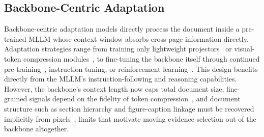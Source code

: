 \documentclass[11pt]{article}
\begin{document}
\subsection{Backbone-Centric Adaptation}
\label{sec:arch-bc}
Backbone-centric adaptation models directly process the document inside a pre-trained MLLM whose context window absorbs cross-page information directly. Adaptation strategies range from training only lightweight projectors~\cite{tanaka2024instructdoc} or visual-token compression modules~\cite{hu2025mplug2}, to fine-tuning the backbone itself through continued pre-training~\cite{duan2025docopilot}, instruction tuning, or reinforcement learning~\cite{xiong2026docr1}. This design benefits directly from the MLLM's instruction-following and reasoning capabilities. However, the backbone's context length now caps total document size, fine-grained signals depend on the fidelity of token compression~\cite{jia2024leopard}, and document structure such as section hierarchy and figure-caption linkage must be recovered implicitly from pixels~\cite{hannan2025docslm}, limits that motivate moving evidence selection out of the backbone altogether.

\end{document}
